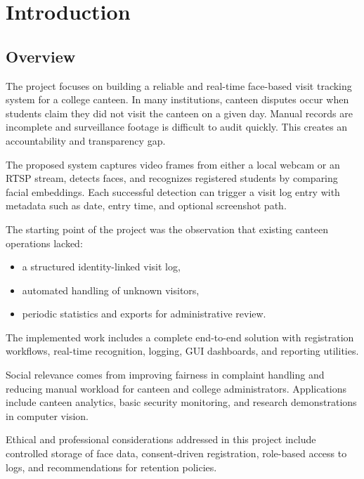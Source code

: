 \documentclass{fisatprojectfinal}
\renewcommand{\baselinestretch}{1.25}
\begin{document}
\cleardoublepage
{}
\thispagestyle{empty}
\listoftables
\thispagestyle{empty}
\newpage

\chapter{Introduction}
\setcounter{page}{1}
\renewcommand{\baselinestretch}{1.50}

\section{Overview}
The project focuses on building a reliable and real-time face-based visit tracking system for a college canteen. In many institutions, canteen disputes occur when students claim they did not visit the canteen on a given day. Manual records are incomplete and surveillance footage is difficult to audit quickly. This creates an accountability and transparency gap.

The proposed system captures video frames from either a local webcam or an RTSP stream, detects faces, and recognizes registered students by comparing facial embeddings. Each successful detection can trigger a visit log entry with metadata such as date, entry time, and optional screenshot path.

The starting point of the project was the observation that existing canteen operations lacked:
\begin{itemize}
	\item a structured identity-linked visit log,
	\item automated handling of unknown visitors,
	\item periodic statistics and exports for administrative review.
\end{itemize}

The implemented work includes a complete end-to-end solution with registration workflows, real-time recognition, logging, GUI dashboards, and reporting utilities.

Social relevance comes from improving fairness in complaint handling and reducing manual workload for canteen and college administrators. Applications include canteen analytics, basic security monitoring, and research demonstrations in computer vision.

Ethical and professional considerations addressed in this project include controlled storage of face data, consent-driven registration, role-based access to logs, and recommendations for retention policies.
\end{document}
